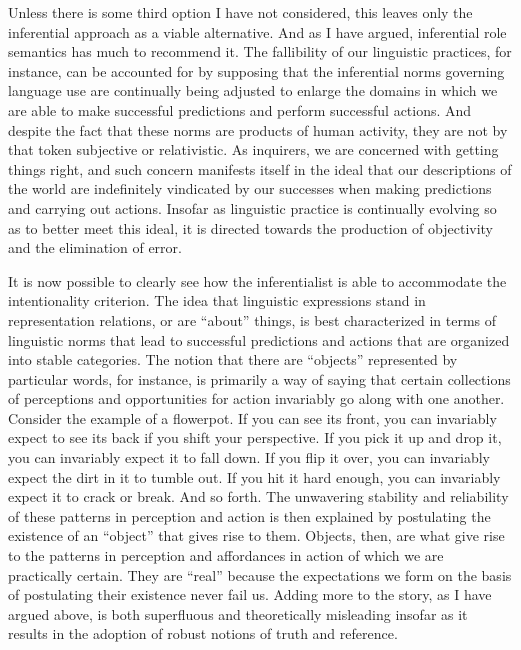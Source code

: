 Unless there is some third option I have not considered, this leaves only the inferential approach as a viable alternative. And as I have argued, inferential role semantics has much to recommend it. The fallibility of our linguistic practices, for instance, can be accounted for by supposing that the inferential norms governing language use are continually being adjusted to enlarge the domains in which we are able to make successful predictions and perform successful actions. And despite the fact that these norms are products of human activity, they are not by that token subjective or relativistic. As inquirers, we are concerned with getting things right, and such concern manifests itself in the ideal that our descriptions of the world are indefinitely vindicated by our successes when making predictions and carrying out actions. Insofar as linguistic practice is continually evolving so as to better meet this ideal, it is directed towards the production of objectivity and the elimination of error.

It is now possible to clearly see how the inferentialist is able to accommodate the intentionality criterion. The idea that linguistic expressions stand in representation relations, or are ``about'' things, is best characterized in terms of linguistic norms that lead to successful predictions and actions that are organized into stable categories. The notion that there are ``objects'' represented by particular words, for instance, is primarily a way of saying that certain collections of perceptions and opportunities for action invariably go along with one another. Consider the example of a flowerpot. If you can see its front, you can invariably expect to see its back if you shift your perspective. If you pick it up and drop it, you can invariably expect it to fall down. If you flip it over, you can invariably expect the dirt in it to tumble out. If you hit it hard enough, you can invariably expect it to crack or break. And so forth. The unwavering stability and reliability of these patterns in perception and action is then explained by postulating the existence of an ``object'' that gives rise to them. Objects, then, are what give rise to the patterns in perception and affordances in action of which we are practically certain. They are ``real'' because the expectations we form on the basis of postulating their existence never fail us. Adding more to the story, as I have argued above, is both superfluous and theoretically misleading insofar as it results in the adoption of robust notions of truth and reference. 

